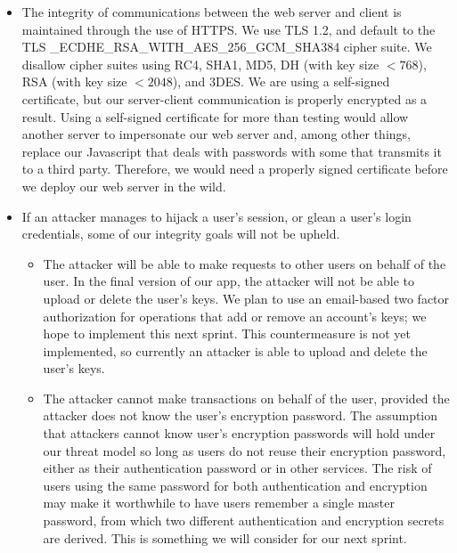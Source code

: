 \documentclass[a4paper,12pt]{article}
\begin{document}
\begin{itemize}
	\item The integrity of communications between the web server and client is maintained through the use of HTTPS.
	We use TLS 1.2, and default to the TLS \_ECDHE\_RSA\_WITH\_AES\_256\_GCM\_SHA384 cipher suite.
	We disallow cipher suites using RC4, SHA1, MD5, DH (with key size $< 768$), RSA (with key size $< 2048$), and 3DES.
	We are using a self-signed certificate, but our server-client communication is properly encrypted as a result.
	Using a self-signed certificate for more than testing would allow another server to impersonate our web server and, among other things, replace our Javascript that deals with passwords with some that transmits it to a third party.
	Therefore, we would need a properly signed certificate before we deploy our web server in the wild.
	
	\item If an attacker manages to hijack a user's session, or glean a user's login credentials, some of our integrity goals will not be upheld.
	\begin{itemize}
		\item The attacker will be able to make requests to other users on behalf of the user.
		In the final version of our app, the attacker will not be able to upload or delete the user's keys. %
		We plan to use an email-based two factor authorization for operations that add or remove an account's keys; we hope to implement this next sprint.
		This countermeasure is not yet implemented, so currently an attacker is able to upload and delete the user's keys.
		\item The attacker cannot make transactions on behalf of the user, provided the attacker does not know the user's encryption password.
		The assumption that attackers cannot know user's encryption passwords will hold under our threat model so long as users do not reuse their encryption password, either as their authentication password or in other services.
		The risk of users using the same password for both authentication and encryption may make it worthwhile to have users remember a single master password, from which two different authentication and encryption secrets are derived. %
		This is something we will consider for our next sprint.
	\end{itemize}
\end{itemize}
\end{document}
